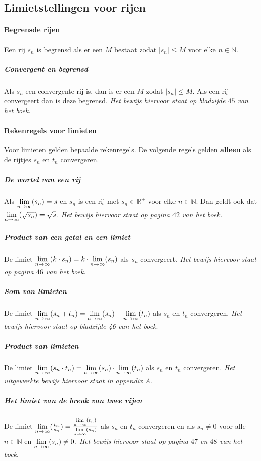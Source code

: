 \subsection{Limietstellingen voor rijen}
\paragraph{Begrensde rijen} Een rij $s_{n}$ is begrensd als er een $M$ bestaat zodat $|s_{n}| \leq M$ voor elke $n\in\mathbb{N}$.

\subparagraph{Convergent en begrensd} Als $s_{n}$ een convergente rij is, dan is er een $M$ zodat $|s_{n}| \leq M$. Als een rij convergeert dan is deze begrensd. \textit{Het bewijs hiervoor staat op bladzijde $45$ van het boek.}

\paragraph{Rekenregels voor limieten} Voor limieten gelden bepaalde rekenregels. De volgende regels gelden \fontsize{13pt}{0pt}\textbf{alleen}\fontsize{11pt}{0pt} als de rijtjes $s_{n}$ en $t_{n}$ convergeren.

\subparagraph{De wortel van een rij} Als $\underset{n\to\infty}{\text{lim}}(s_{n})=s$ en $s_{n}$ is een rij met $s_{n}\in\mathbb{R}^{+}$ voor elke $n\in\mathbb{N}$. Dan geldt ook dat $\underset{n\to\infty}{\text{lim}}(\sqrt{s_{n}})=\sqrt{s}$. \textit{Het bewijs hiervoor staat op pagina $42$ van het boek.}

\subparagraph{Product van een getal en een limiet} De limiet $\underset{n\to\infty}{\text{lim}}(k \cdot s_{n}) = k\cdot\underset{n\to\infty}{\text{lim}}(s_{n})$ als $s_{n}$ convergeert. \textit{Het bewijs hiervoor staat op pagina $46$ van het boek}.

\subparagraph{Som van limieten} De limiet $\underset{n\to\infty}{\text{lim}}(s_{n}+t_{n}) = \underset{n\to\infty}{\text{lim}}(s_{n})+\underset{n\to\infty}{\text{lim}}(t_{n})$ als $s_{n}$ en $t_{n}$ convergeren. \textit{Het bewijs hiervoor staat op bladzijde 46 van het boek}.

\subparagraph{Product van limieten} De limiet $\underset{n\to\infty}{\text{lim}}(s_{n} \cdot t_{n}) = \underset{n\to\infty}{\text{lim}}(s_{n}) \cdot \underset{n\to\infty}{\text{lim}}(t_{n})$ als $s_{n}$ en $t_{n}$ convergeren. \textit{Het uitgewerkte bewijs hiervoor staat in \hyperref[sec:AA]{appendix A}}.

\subparagraph{Het limiet van de breuk van twee rijen} De limiet $\underset{n\to\infty}{\text{lim}}(\frac{t_{n}}{s_{n}}) = \frac{\underset{n\to\infty}{\text{lim}}(t_{n})}{\underset{n\to\infty}{\text{lim}}(s_{n})}$ als $s_{n}$ en $t_{n}$ convergeren en als $s_{n}\neq0$ voor alle $n\in\mathbb{N}$ en $\underset{n\to\infty}{\text{lim}}(s_{n}) \neq 0$. \textit{Het bewijs hiervoor staat op pagina $47$ en $48$ van het boek}.

